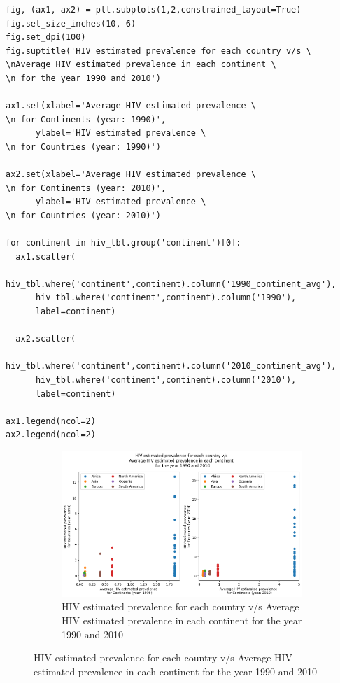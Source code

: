 \documentclass[UTF8, letter]{article}
\begin{document}
\pagebreak
\begin{codeblock}
\begin{verbatim}
fig, (ax1, ax2) = plt.subplots(1,2,constrained_layout=True)
fig.set_size_inches(10, 6)
fig.set_dpi(100)
fig.suptitle('HIV estimated prevalence for each country v/s \
\nAverage HIV estimated prevalence in each continent \
\n for the year 1990 and 2010')

ax1.set(xlabel='Average HIV estimated prevalence \
\n for Continents (year: 1990)', 
      ylabel='HIV estimated prevalence \
\n for Countries (year: 1990)')

ax2.set(xlabel='Average HIV estimated prevalence \
\n for Continents (year: 2010)', 
      ylabel='HIV estimated prevalence \
\n for Countries (year: 2010)')

for continent in hiv_tbl.group('continent')[0]:
  ax1.scatter(
      hiv_tbl.where('continent',continent).column('1990_continent_avg'), 
      hiv_tbl.where('continent',continent).column('1990'), 
      label=continent)
  
  ax2.scatter(
      hiv_tbl.where('continent',continent).column('2010_continent_avg'), 
      hiv_tbl.where('continent',continent).column('2010'), 
      label=continent)

ax1.legend(ncol=2)
ax2.legend(ncol=2)
\end{verbatim}
\end{codeblock}


\begin{figure}
	\centering
	\begin{subfigure}{1\textwidth}
		\centering
		\includegraphics[width=\linewidth]{output_20.png}
		\caption{HIV estimated prevalence for each country v/s Average HIV estimated prevalence in each continent for the year 1990 and 2010}
		\label{fig:line1}		
	\end{subfigure}			
\end{figure}
	
\end{document}
